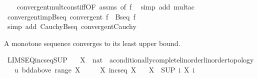 \begin{isabellebody}
%
\isadelimproof
\ \ %
\endisadelimproof
%
\isatagproof
{}\isamarkupfalse%
\ convergent{\isacharunderscore}{\kern0pt}mult{\isacharunderscore}{\kern0pt}const{\isacharunderscore}{\kern0pt}iff{\isacharbrackleft}{\kern0pt}OF\ assms{\isacharcomma}{\kern0pt}\ of\ f{\isacharbrackright}{\kern0pt}\ \isamarkupfalse%
\ {\isacharparenleft}{\kern0pt}simp\ add{\isacharcolon}{\kern0pt}\ mult{\isacharunderscore}{\kern0pt}ac{\isacharparenright}{\kern0pt}%
\endisatagproof
{\isafoldproof}%
%
\isadelimproof
\isanewline
%
\endisadelimproof
\isanewline
{}\isamarkupfalse%
\ convergent{\isacharunderscore}{\kern0pt}imp{\isacharunderscore}{\kern0pt}Bseq{\isacharcolon}{\kern0pt}\ {\isachardoublequoteopen}convergent\ f\ {\isasymLongrightarrow}\ Bseq\ f{\isachardoublequoteclose}\isanewline
%
\isadelimproof
\ \ %
\endisadelimproof
%
\isatagproof
{}\isamarkupfalse%
\ {\isacharparenleft}{\kern0pt}simp\ add{\isacharcolon}{\kern0pt}\ Cauchy{\isacharunderscore}{\kern0pt}Bseq\ convergent{\isacharunderscore}{\kern0pt}Cauchy{\isacharparenright}{\kern0pt}%
\endisatagproof
{\isafoldproof}%
%
\isadelimproof
%
\endisadelimproof
%
\begin{isamarkuptext}%
A monotone sequence converges to its least upper bound.%
\end{isamarkuptext}\isamarkuptrue%
\isamarkupfalse%
\ LIMSEQ{\isacharunderscore}{\kern0pt}incseq{\isacharunderscore}{\kern0pt}SUP{\isacharcolon}{\kern0pt}\isanewline
\ \ \ X\ {\isacharcolon}{\kern0pt}{\isacharcolon}{\kern0pt}\ {\isachardoublequoteopen}nat\ {\isasymRightarrow}\ {\isacharprime}{\kern0pt}a{\isacharcolon}{\kern0pt}{\isacharcolon}{\kern0pt}{\isacharbraceleft}{\kern0pt}conditionally{\isacharunderscore}{\kern0pt}complete{\isacharunderscore}{\kern0pt}linorder{\isacharcomma}{\kern0pt}linorder{\isacharunderscore}{\kern0pt}topology{\isacharbraceright}{\kern0pt}{\isachardoublequoteclose}\isanewline
\ \ \ u{\isacharcolon}{\kern0pt}\ {\isachardoublequoteopen}bdd{\isacharunderscore}{\kern0pt}above\ {\isacharparenleft}{\kern0pt}range\ X{\isacharparenright}{\kern0pt}{\isachardoublequoteclose}\isanewline
\ \ \ \ \ X{\isacharcolon}{\kern0pt}\ {\isachardoublequoteopen}incseq\ X{\isachardoublequoteclose}\isanewline
\ \ \ {\isachardoublequoteopen}X\ {\isasymlonglonglongrightarrow}\ {\isacharparenleft}{\kern0pt}SUP\ i{\isachardot}{\kern0pt}\ X\ i{\isacharparenright}{\kern0pt}{\isachardoublequoteclose}\isanewline
%
\isadelimproof
\ \ %
\endisadelimproof
%
\isatagproof
{}\isamarkupfalse%

\end{isabellebody}
